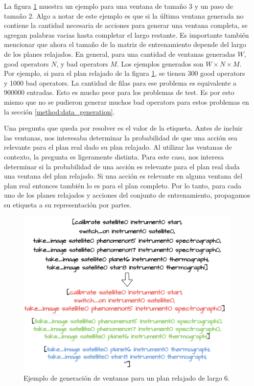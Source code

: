 La figura \ref{fig:window_example} muestra un ejemplo para una ventana de tamaño
3 y un paso de tamaño 2. Algo a notar de este ejemplo es que si la última
ventana generada no contiene la cantidad necesaria de acciones para generar una
ventana completa, se agregan palabras vacias hasta completar el largo restante.
Es importante también mencionar que ahora el tamaño de la matriz de entrenamiento
depende del largo de los planes relajados. En general, para una cantidad de
ventanas generadas $W$, good operators $N$, y bad operators $M$. Los ejemplos
generados son $W \times N \times M$. Por ejemplo, si para el plan relajado de la
figura \ref{fig:window_example}, se tienen 300 good operators y 1000 bad
operators. La cantidad de filas para ese problema es equivalente a $900000$
entradas. Esto es mucho peor para los problemas de test. Es por esto mismo que
no se pudieron generar muchos bad operators para estos problemas en la sección
\ref{method:data_generation}.

Una pregunta que queda por resolver es el valor de la etiqueta. Antes de incluir
las ventanas, nos interesaba determinar la probabilidad de que una acción sea
relevante para el plan real dado su plan relajado. Al utilizar las ventanas de
contexto, la pregunta es ligeramente distinta. Para este caso, nos interesa
determinar si la probabilidad de una acción es relevante para el plan real dada
una ventana del plan relajado. Si una acción es relevante en alguna ventana del
plan real entonces también lo es para el plan completo. Por lo tanto, para cada
uno de los planes relajados y acciones del conjunto de entrenamiento, propagamos
su etiqueta a su representación por partes.

\begin{figure}[t!]
    \centering
    \includegraphics[width=\linewidth]{figures/window_example.png}
    \caption{Ejemplo de generación de ventanas para un plan relajado de largo 6.}
    \label{fig:window_example}
\end{figure}


